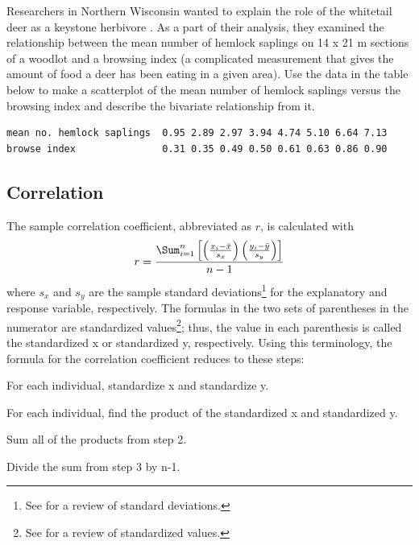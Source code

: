 \documentclass[10pt,openany]{book}\usepackage[]{graphicx}\usepackage[]{color}
\begin{document}
\begin{exsection}
  \item \label{revex:qbEDAScat} \rhw{}Researchers in Northern Wisconsin wanted to explain the role of the whitetail deer as a keystone herbivore \citep{WallerAlverson1997}.  As a part of their analysis, they examined the relationship between the mean number of hemlock saplings on 14 x 21 m sections of a woodlot and a browsing index (a complicated measurement that gives the amount of food a deer has been eating in a given area).  Use the data in the table below to make a scatterplot of the mean number of hemlock saplings versus the browsing index and describe the bivariate relationship from it. 
  \begin{Verbatim}
mean no. hemlock saplings  0.95 2.89 2.97 3.94 4.74 5.10 6.64 7.13
browse index               0.31 0.35 0.49 0.50 0.61 0.63 0.86 0.90
  \end{Verbatim}
\end{exsection}


\vspace{-18pt}
\subsection{Correlation}\label{sect:corr}
The sample correlation coefficient, abbreviated as $r$, is calculated with
\begin{equation}
  r = \frac{\Sum_{i=1}^{n}\left[\left(\frac{x_{i}-\bar{x}}{s_{x}}\right)\left(\frac{y_{i}-\bar{y}}{s_{y}}\right)\right]}{n-1}
\end{equation}
where $s_{x}$ and $s_{y}$ are the sample standard deviations\footnote{See  for a review of standard deviations.} for the explanatory and response variable, respectively.  The formulas in the two sets of parentheses in the numerator are standardized values\footnote{See  for a review of standardized values.}; thus, the value in each parenthesis is called the standardized x or standardized y, respectively.  Using this terminology, the formula for the correlation coefficient reduces to these steps:
\begin{Enumerate}
  \item For each individual, standardize x and standardize y.
  \item For each individual, find the product of the standardized x and standardized y.
  \item Sum all of the products from step 2.
  \item Divide the sum from step 3 by n-1.
\end{Enumerate}
\end{document}
